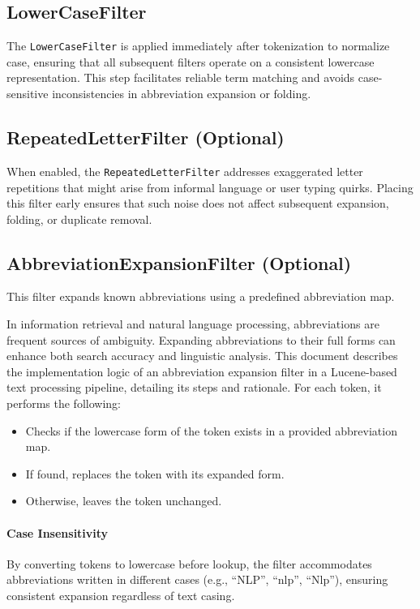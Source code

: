 \subsection{LowerCaseFilter}
The \texttt{LowerCaseFilter} is applied immediately after tokenization to normalize case, ensuring that all subsequent filters operate on a consistent lowercase representation. This step facilitates reliable term matching and avoids case-sensitive inconsistencies in abbreviation expansion or folding.

\subsection{RepeatedLetterFilter (Optional)}
When enabled, the \texttt{RepeatedLetterFilter} addresses exaggerated letter repetitions that might arise from informal language or user typing quirks. Placing this filter early ensures that such noise does not affect subsequent expansion, folding, or duplicate removal.

\subsection{AbbreviationExpansionFilter (Optional)}
This filter expands known abbreviations using a predefined abbreviation map. 

In information retrieval and natural language processing, abbreviations are frequent sources of ambiguity. Expanding abbreviations to their full forms can enhance both search accuracy and linguistic analysis. This document describes the implementation logic of an abbreviation expansion filter in a Lucene-based text processing pipeline, detailing its steps and rationale.
For each token, it performs the following:
\begin{itemize}
    \item Checks if the lowercase form of the token exists in a provided abbreviation map.
    \item If found, replaces the token with its expanded form.
    \item Otherwise, leaves the token unchanged.
\end{itemize}


\paragraph{Case Insensitivity}

By converting tokens to lowercase before lookup, the filter accommodates abbreviations written in different cases (e.g., ``NLP'', ``nlp'', ``Nlp''), ensuring consistent expansion regardless of text casing.

